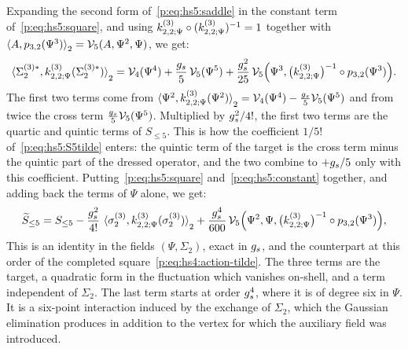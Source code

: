 Expanding the second form of~\eqref{p:eq:hs5:saddle} in the constant term of~\eqref{p:eq:hs5:square}, and using $\kin{2}{\Psi}{3} \circ (\kin{2}{\Psi}{3})^{-1} = 1$ together with $\pair[2]{A}{\sprod{3}{2}(\Psi^3)} = \vertex{5}(A, \Psi^2, \Psi)$, we get:
\begin{equation}
  \label{p:eq:hs5:constant}
  \pair[2]{\Sigma_2^{(3)*}}{\kin{2}{\Psi}{3}(\Sigma_2^{(3)*})}
    = \vertex{4}(\Psi^4)
      + \frac{\gs}{5} \, \vertex{5}(\Psi^5)
      + \frac{\gs^2}{25} \, \vertex{5}\Big( \Psi^3, \big( \kin{2}{\Psi}{3} \big)^{-1} \circ \sprod{3}{2}(\Psi^3) \Big).
\end{equation}
The first two terms come from $\pair[2]{\Psi^2}{\kin{2}{\Psi}{3}(\Psi^2)} = \vertex{4}(\Psi^4) - \tfrac{\gs}{5} \vertex{5}(\Psi^5)$ and from twice the cross term $\tfrac{\gs}{5} \vertex{5}(\Psi^5)$.
Multiplied by $\gs^2 / 4!$, the first two terms are the quartic and quintic terms of $S_{\le 5}$.
This is how the coefficient $1 / 5!$ of~\eqref{p:eq:hs5:S5tilde} enters: the quintic term of the target is the cross term minus the quintic part of the dressed operator, and the two combine to $+ \gs / 5$ only with this coefficient.
Putting~\eqref{p:eq:hs5:square} and~\eqref{p:eq:hs5:constant} together, and adding back the terms of $\Psi$ alone, we get:
\begin{equation}
  \label{p:eq:hs5:identity}
  \caction[\le 5]
    = S_{\le 5}
      - \frac{\gs^2}{4!} \, \pair[2]{\sigma_2^{(3)}}{\kin{2}{\Psi}{3}(\sigma_2^{(3)})}
      + \frac{\gs^4}{600} \, \vertex{5}\Big( \Psi^2, \Psi, \big( \kin{2}{\Psi}{3} \big)^{-1} \circ \sprod{3}{2}(\Psi^3) \Big),
\end{equation}
This is an identity in the fields $(\Psi, \Sigma_2)$, exact in $\gs$, and the counterpart at this order of the completed square~\eqref{p:eq:hs4:action-tilde}.
The three terms are the target, a quadratic form in the fluctuation which vanishes on-shell, and a term independent of $\Sigma_2$.
The last term starts at order $\gs^4$, where it is of degree six in $\Psi$.
It is a six-point interaction induced by the exchange of $\Sigma_2$, which the Gaussian elimination produces in addition to the vertex for which the auxiliary field was introduced.

